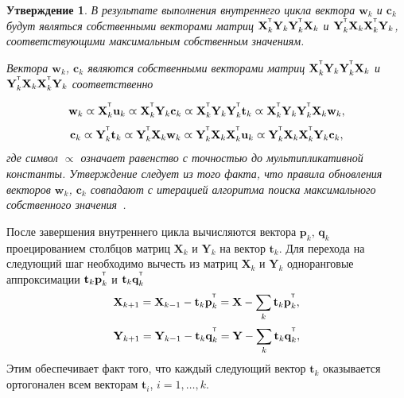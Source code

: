 \documentclass[12pt,twoside]{article}
\newtheorem{statement}{Утверждение}
\newcommand{\bw}{\mathbf{w}}
\newcommand{\bY}{\mathbf{Y}}
\newcommand{\bX}{\mathbf{X}}
\newcommand{\bu}{\mathbf{u}}
\newcommand{\bt}{\mathbf{t}}
\newcommand{\bp}{\mathbf{p}}
\newcommand{\bq}{\mathbf{q}}
\newcommand{\bc}{\mathbf{c}}
\begin{document}
\begin{statement}
В результате выполнения внутреннего цикла вектора $\bw_k$ и $\bc_k$ будут являться собственными векторами матриц $\bX_k^{\T} \bY_k \bY_k^{\T} \bX_k$ и $\bY_k^{\T} \bX_k \bX_k^{\T} \bY_k$, соответствующими максимальным собственным значениям.

Вектора $\bw_k$, $\bc_k$ являются собственными векторами матриц $\bX_k^{\T} \bY_k \bY_k^{\T} \bX_k$ и $\bY_k^{\T} \bX_k \bX_k^{\T} \bY_k$ соответственно

\begin{equation*}
\bw_k \varpropto \bX_k^{\T} \bu_k \varpropto \bX_k^{\T} \bY_k \bc_k \varpropto \bX_k^{\T} \bY_k \bY_k^{\T} \bt_k \varpropto \bX_k^{\T} \bY_k \bY_k^{\T} \bX_k \bw_k,
\end{equation*}
\begin{equation*}
\bc_k \varpropto \bY_k^{\T} \bt_k \varpropto \bY_k^{\T} \bX_k \bw_k \varpropto \bY_k^{\T} \bX_k \bX_k^{\T} \bu_k \varpropto \bY_k^{\T} \bX_k \bX_k^{\T} \bY_k \bc_k,
\end{equation*}
где символ $\varpropto$ означает равенство с точностью до мультипликативной константы. 
Утверждение следует из того факта, что правила обновления векторов $\bw_k$, $\bc_k$ совпадают с итерацией алгоритма поиска максимального собственного значения~\cite{Mises1929}.
\end{statement}

После завершения внутреннего цикла вычисляются вектора $\bp_k$, $\bq_k$ проецированием столбцов матриц $\bX_k$ и $\bY_k$ на вектор $\bt_k$. Для перехода на следующий шаг необходимо вычесть из матриц $\bX_k$ и $\bY_k$ одноранговые аппроксимации $\bt_k \bp_k^{\T}$ и $\bt_k \bq_k^{\T}$
\begin{equation*}
    \bX_{k + 1} = \bX_{k-1} - \bt_k \bp_k^{\T} = \bX - \sum_k \bt_k \bp_k^{\T},
\end{equation*}
\begin{equation*}
    \bY_{k + 1} = \bY_{k-1} - \bt_k \bq_k^{\T} = \bY - \sum_k \bt_k \bq_k^{\T},
\end{equation*}
Этим обеспечивает факт того, что каждый следующий вектор $\bt_k$ оказывается ортогонален всем векторам $\bt_i$, $i=1, \dots, k$.
\end{document}
